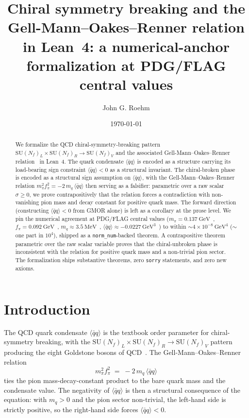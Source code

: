 \documentclass[twocolumn]{revtex4-2}
\newcommand{\qbarq}{\langle \bar{q} q \rangle}
\newcommand{\fpi}{f_{\pi}}
\newcommand{\mpi}{m_{\pi}}
\newcommand{\mq}{m_q}
\begin{document}
\title{Chiral symmetry breaking and the Gell-Mann--Oakes--Renner
relation in Lean~4: a numerical-anchor formalization at PDG/FLAG
central values}

\author{John G. Roehm}

\date{\today}

\begin{abstract}
We formalize the QCD chiral-symmetry-breaking pattern
$\mathrm{SU}(N_f)_L \times \mathrm{SU}(N_f)_R \to \mathrm{SU}(N_f)_V$
and the associated Gell-Mann--Oakes--Renner
relation~\cite{GMOR1968} in Lean~4. The quark
condensate $\qbarq$ is encoded as a structure carrying its
load-bearing sign constraint $\qbarq < 0$ as a structural invariant.
The chiral-broken phase is encoded as a structural sign assumption
on $\qbarq$, with the Gell-Mann--Oakes--Renner relation
$\mpi^2 \fpi^2 = -2\,\mq\,\qbarq$ then serving as a falsifier:
parametric over a raw scalar $\sigma \ge 0$, we prove
contrapositively that the relation forces a contradiction with
non-vanishing pion mass and decay constant for positive quark
mass. The forward direction (constructing $\qbarq < 0$ from
GMOR alone) is left as a corollary at the prose level. We pin the numerical
agreement at PDG/FLAG central values
($\mpi = 0.137~\mathrm{GeV}$~\cite{PDG2022},
$\fpi = 0.092~\mathrm{GeV}$~\cite{PDG2022},
$\mq \approx 3.5~\mathrm{MeV}$~\cite{PDG2022},
$\qbarq \approx -0.0227~\mathrm{GeV}^3$~\cite{FLAG2021}) to within
$\sim 4 \times 10^{-8}~\mathrm{GeV}^4$ ($\sim$one part in $10^4$),
shipped as a \texttt{norm\_num}-backed theorem. A contrapositive theorem
parametric over the raw scalar variable proves that the
chiral-unbroken phase is inconsistent with the relation for positive
quark mass and a non-trivial pion sector. The formalization ships
\chiralSsbThms{} substantive theorems, zero \texttt{sorry} statements, and zero
new axioms.
\end{abstract}

\maketitle

\section{Introduction}
\label{sec:intro}

The QCD quark condensate $\qbarq$ is the textbook order parameter for
chiral-symmetry breaking, with the
$\mathrm{SU}(N_f)_L \times \mathrm{SU}(N_f)_R \to
\mathrm{SU}(N_f)_V$ pattern producing the eight Goldstone bosons of
QCD~\cite{NambuJonaLasinio1961}. The Gell-Mann--Oakes--Renner
relation~\cite{GMOR1968}
\begin{equation}
\mpi^2 \fpi^2 \;=\; -2\,\mq\,\qbarq
\label{eq:gmor}
\end{equation}
ties the pion mass-decay-constant product to the bare quark mass and
the condensate value. The negativity of $\qbarq$ is then a structural
consequence of the equation: with $\mq > 0$ and the pion sector
non-trivial, the left-hand side is strictly positive, so the
right-hand side forces $\qbarq < 0$.
\end{document}
